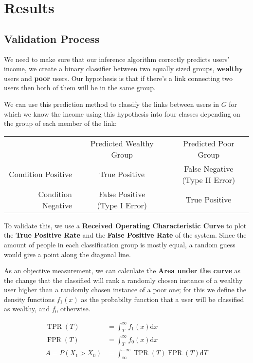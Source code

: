 \section{Results}

\subsection{Validation Process}

We need to make sure that our inference algorithm correctly predicts users' income, we create a binary classifier between two equally sized groups, \textbf{wealthy} users and \textbf{poor} users. Our hypothesis is that if there's a link connecting two users then both of them will be in the same group.

We can use this prediction method to classify the links between users in $ G $ for which we know the income using this hypothesis into four classes depending on the group of each member of the link:

\begin{tabularx}{\textwidth}{ r c c }
& Predicted Wealthy Group & Predicted Poor Group \\
Condition Positive & \cellcolor{green} True Positive & \cellcolor{red} \makecell{False Negative \\ (Type II Error)} \\ 
Condition Negative & \cellcolor{red} \makecell{False Positive \\ (Type I Error)} & \cellcolor{green} True Positive \\
\end{tabularx}

To validate this, we use a \textbf{Received Operating Characteristic Curve} to plot the \textbf{True Positive Rate} and the \textbf{False Positive Rate} of the system. Since the amount of people in each classification group is mostly equal, a random guess would give a point along the diagonal line.

As an objective measurement, we can calculate the \textbf{Area under the curve} as the change that the classified will rank a randomly chosen instance of a wealthy user higher than a randomly chosen instance of a poor one; for this we define the density functions $ f_1(x) $ as the probabilty function that a user will be classified as wealthy, and $ f_0 $ otherwise.

\begin{align*}
\operatorname{TPR}(T) &= \int^{\infty}_T f_1(x) \mathrm{d}x \\
\operatorname{FPR}(T) &= \int^{\infty}_T f_0(x) \mathrm{d}x \\
A = P(X_1 > X_0) &= \int^{-\infty}_{\infty} \operatorname{TPR}(T) \operatorname{FPR}(T) \mathrm{d}T
\end{align*}